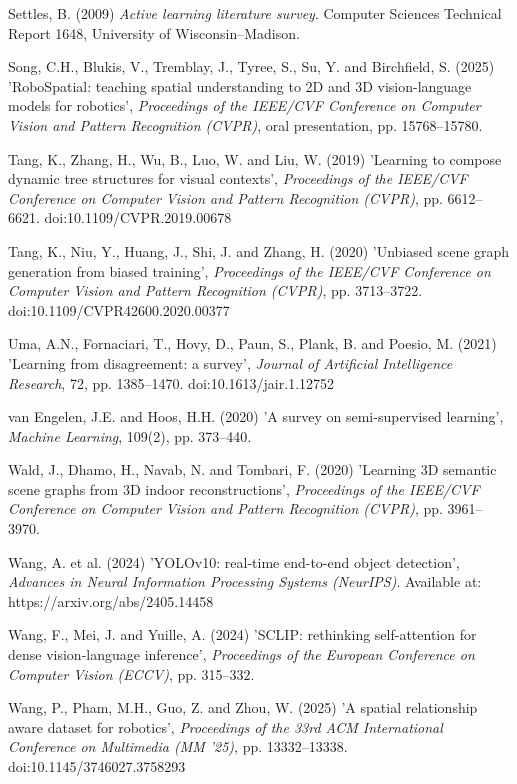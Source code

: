 \begin{description}[leftmargin=2em, labelindent=0em, itemsep=0.1em, parsep=0pt, topsep=0.3em]
\item[] Settles, B. (2009) \textit{Active learning literature survey}. Computer Sciences Technical Report 1648, University of Wisconsin--Madison.
\item[] Song, C.H., Blukis, V., Tremblay, J., Tyree, S., Su, Y. and Birchfield, S. (2025) 'RoboSpatial: teaching spatial understanding to 2D and 3D vision-language models for robotics', \textit{Proceedings of the IEEE/CVF Conference on Computer Vision and Pattern Recognition (CVPR)}, oral presentation, pp. 15768--15780.
\item[] Tang, K., Zhang, H., Wu, B., Luo, W. and Liu, W. (2019) 'Learning to compose dynamic tree structures for visual contexts', \textit{Proceedings of the IEEE/CVF Conference on Computer Vision and Pattern Recognition (CVPR)}, pp. 6612--6621. doi:10.1109/CVPR.2019.00678
\item[] Tang, K., Niu, Y., Huang, J., Shi, J. and Zhang, H. (2020) 'Unbiased scene graph generation from biased training', \textit{Proceedings of the IEEE/CVF Conference on Computer Vision and Pattern Recognition (CVPR)}, pp. 3713--3722. doi:10.1109/CVPR42600.2020.00377
\item[] Uma, A.N., Fornaciari, T., Hovy, D., Paun, S., Plank, B. and Poesio, M. (2021) 'Learning from disagreement: a survey', \textit{Journal of Artificial Intelligence Research}, 72, pp. 1385--1470. doi:10.1613/jair.1.12752
\item[] van Engelen, J.E. and Hoos, H.H. (2020) 'A survey on semi-supervised learning', \textit{Machine Learning}, 109(2), pp. 373--440.
\item[] Wald, J., Dhamo, H., Navab, N. and Tombari, F. (2020) 'Learning 3D semantic scene graphs from 3D indoor reconstructions', \textit{Proceedings of the IEEE/CVF Conference on Computer Vision and Pattern Recognition (CVPR)}, pp. 3961--3970.
\item[] Wang, A. et al. (2024) 'YOLOv10: real-time end-to-end object detection', \textit{Advances in Neural Information Processing Systems (NeurIPS)}. Available at: https:/\allowbreak{}/\allowbreak{}arxiv.\allowbreak{}org/\allowbreak{}abs/\allowbreak{}2405.\allowbreak{}14458
\item[] Wang, F., Mei, J. and Yuille, A. (2024) 'SCLIP: rethinking self-attention for dense vision-language inference', \textit{Proceedings of the European Conference on Computer Vision (ECCV)}, pp. 315--332.
\item[] Wang, P., Pham, M.H., Guo, Z. and Zhou, W. (2025) 'A spatial relationship aware dataset for robotics', \textit{Proceedings of the 33rd ACM International Conference on Multimedia (MM '25)}, pp. 13332--13338. doi:10.1145/3746027.3758293

\end{description}
